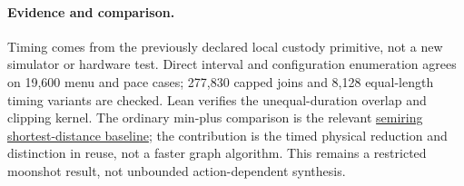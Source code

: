 \documentclass[11pt]{article}
\begin{document}
\paragraph{Evidence and comparison.}
Timing comes from the previously declared local custody
primitive, not a new simulator or hardware test. Direct
interval and configuration enumeration agrees on 19,600
menu and pace cases; 277,830 capped joins and 8,128
equal-length timing variants are checked. Lean verifies
the unequal-duration overlap and clipping kernel.
The ordinary min-plus comparison is the relevant
\href{https://cs.nyu.edu/~mohri/pub/jalc.pdf}{semiring
shortest-distance baseline}; the contribution is the
timed physical reduction and distinction in reuse, not
a faster graph algorithm. This remains a restricted
moonshot result, not unbounded action-dependent synthesis.
\end{document}
